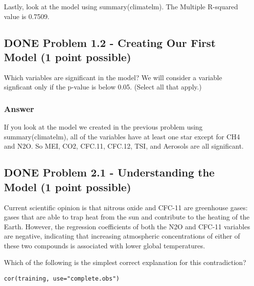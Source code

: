 \documentclass[letterpaper, 9pt, onecolumn, twoside, technote, final]{IEEEtran}
\begin{document}
Lastly, look at the model using summary(climatelm). The Multiple
R-squared value is 0.7509.

\subsection{{\bfseries\sffamily DONE} Problem 1.2 - Creating Our First Model (1 point possible)}
\label{sec-1-2}
Which variables are significant in the model? We will consider a
variable signficant only if the p-value is below 0.05. (Select all
that apply.)

\subsubsection{Answer}
\label{sec-1-2-1}

If you look at the model we created in the previous problem using
summary(climatelm), all of the variables have at least one star except
for CH4 and N2O. So MEI, CO2, CFC.11, CFC.12, TSI, and Aerosols are
all significant.

\subsection{{\bfseries\sffamily DONE} Problem 2.1 - Understanding the Model (1 point possible)}
\label{sec-1-3}
Current scientific opinion is that nitrous oxide and CFC-11 are
greenhouse gases: gases that are able to trap heat from the sun and
contribute to the heating of the Earth. However, the regression
coefficients of both the N2O and CFC-11 variables are negative,
indicating that increasing atmospheric concentrations of either of
these two compounds is associated with lower global temperatures.

Which of the following is the simplest correct explanation for this
contradiction?

\begin{verbatim}
cor(training, use="complete.obs")
\end{verbatim}
\end{document}
